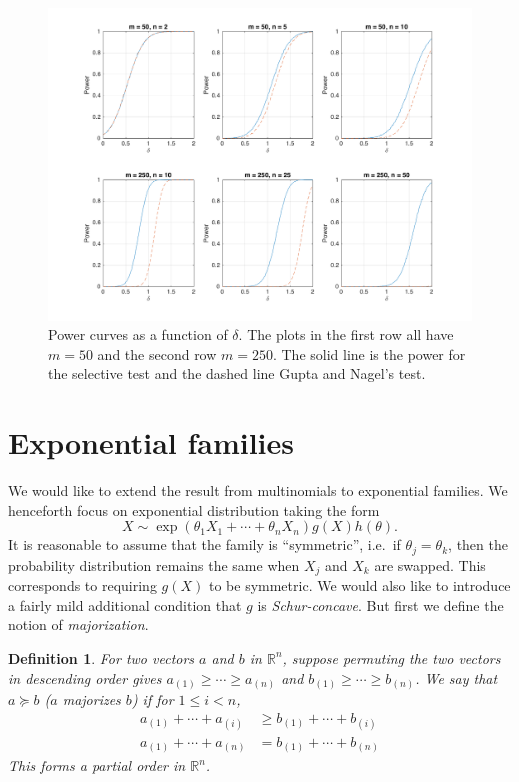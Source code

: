 \documentclass[11pt]{article}
\newtheorem{definition}{Definition}
\newcommand{\RR}{\mathbb{R}}
\begin{document}
\begin{figure}[htbp]
\begin{center}
\includegraphics[width = \textwidth]{plotMultinomialPower}
\end{center}
\caption{Power curves as a function of $\delta$. The plots in the first row all have $m = 50$ and the second row $m = 250$. The solid line is the power for the selective test and the dashed line Gupta and Nagel's test.}
\label{fig:power}
\end{figure}

\section{Exponential families}
\label{sec:exponential_families}

We would like to extend the result from multinomials to exponential families. We henceforth focus on exponential distribution taking the form
\begin{equation}
X \sim \exp\left(\theta_1 X_1 + \cdots + \theta_n X_n\right) g\left(X\right) h\left(\theta\right).
\label{eqn:exp_family}
\end{equation}
It is reasonable to assume that the family is ``symmetric'', i.e.\ if $\theta_j = \theta_k$, then the probability distribution remains the same when $X_j$ and $X_k$ are swapped. This corresponds to requiring $g\left(X\right)$ to be symmetric. We would also like to introduce a fairly mild additional condition that $g$ is {\em Schur-concave}. But first we define the notion of {\em majorization}.

\begin{definition}
For two vectors $a$ and $b$ in $\RR^n$, suppose permuting the two vectors in descending order gives
$a_{\left(1\right)} \ge \cdots \ge a_{\left(n\right)}$ and $b_{\left(1\right)} \ge \cdots \ge b_{\left(n\right)}$. We say that $a \succeq b$ ($a$ majorizes $b$) if for $1 \le i < n$,
\begin{align*}
a_{\left(1\right)} + \cdots + a_{\left(i\right)} & \ge b_{\left(1\right)} + \cdots + b_{\left(i\right)} \\
a_{\left(1\right)} + \cdots + a_{\left(n\right)} & = b_{\left(1\right)} + \cdots + b_{\left(n\right)}
\end{align*}
This forms a partial order in $\RR^n$.
\end{definition}
\end{document}
